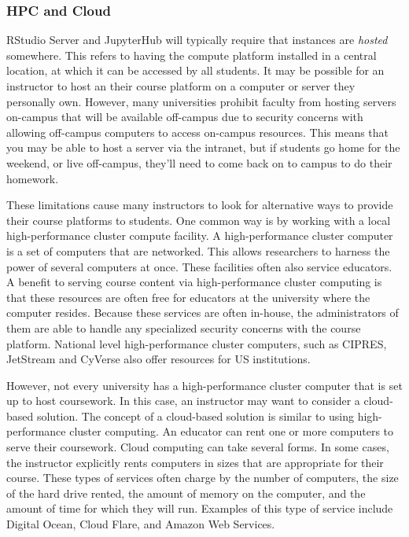 \subsubsection{HPC and Cloud}\label{HPC}

RStudio Server and JupyterHub will typically require that instances are \textit{hosted} somewhere.
This refers to having the compute platform installed in a central location, at which it can be accessed by all students.
It may be possible for an instructor to host an their course platform on a computer or server they personally own.
However, many universities prohibit faculty from hosting servers on-campus that will be available off-campus due to security concerns with allowing off-campus computers to access on-campus resources.
This means that you may be able to host a server via the intranet, but if students go home for the weekend, or live off-campus, they'll need to come back on to campus to do their homework.

These limitations cause many instructors to look for alternative ways to provide their course platforms to students.
One common way is by working with a local high-performance cluster compute facility.
A high-performance cluster computer is a set of computers that are networked. 
This allows researchers to harness the power of several computers at once.
These facilities often also service educators.
A benefit to serving course content via high-performance cluster computing is that these resources are often free for educators at the university where the computer resides.
Because these services are often in-house, the administrators of them are able to handle any specialized security concerns with the course platform.
National level high-performance cluster computers, such as CIPRES, JetStream and CyVerse also offer resources for US institutions.

However, not every university has a high-performance cluster computer that is set up to host coursework. 
In this case, an instructor may want to consider a cloud-based solution. 
The concept of a cloud-based solution is similar to using high-performance cluster computing.
An educator can rent one or more computers to serve their coursework. 
Cloud computing can take several forms. 
In some cases, the instructor explicitly rents computers in sizes that are appropriate for their course.
These types of services often charge by the number of computers, the size of the hard drive rented, the amount of memory on the computer, and the amount of time for which they will run.
Examples of this type of service include Digital Ocean, Cloud Flare, and Amazon Web Services.

